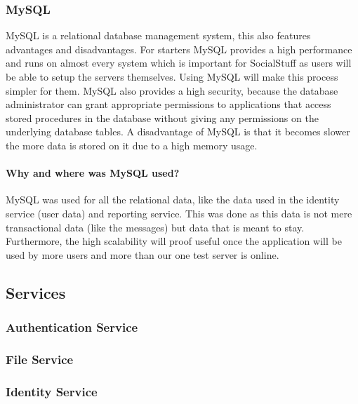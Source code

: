 \subsubsection{MySQL}
MySQL is a relational database management system, this also features advantages and disadvantages.
For starters MySQL provides a high performance and runs on almost every system which is important for SocialStuff as
users will be able to setup the servers themselves.
Using MySQL will make this process simpler for them.
MySQL also provides a high security, because the database administrator can grant appropriate permissions to
applications that access stored procedures in the database without giving any permissions on the underlying database
tables.
A disadvantage of MySQL is that it becomes slower the more data is stored on it due to a high memory usage.

\paragraph{Why and where was MySQL used?}
MySQL was used for all the relational data, like the data used in the identity service (user data) and reporting
service.
This was done as this data is not mere transactional data (like the messages) but data that is meant to stay.
Furthermore, the high scalability will proof useful once the application will be used by more users and more than our
one test server is online.

\subsection{Services}\label{subsec:services2}

\subsubsection{Authentication Service}

\subsubsection{File Service}

\subsubsection{Identity Service}
\label{subsubsec:identitySer}

